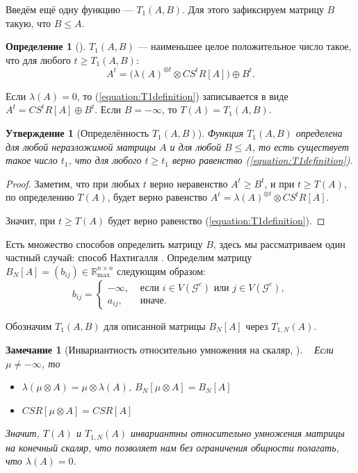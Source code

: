 \documentclass[12pt]{article}
\newtheorem{proposition}[theorem]{Утверждение}
\newtheorem{remark}[theorem]{Замечание}
\theoremstyle{definition}
\newtheorem{definition}[theorem]{Определение}
\begin{document}
Введём ещё одну функцию --- $T_1(A, B)$. Для этого зафиксируем матрицу $B$ такую, что $B \le A$.

\begin{definition} [{\cite[страница 165]{15WeakCSRExpantion}}]
\label{T1definition}
$T_1(A, B)$ --- наименьшее целое положительное число такое, что для любого $t \ge T_1(A, B)$:
\begin{equation}
\label{equation:T1definition}
    A^t = \big(\lambda(A)^{\otimes t} \otimes CS^tR[A] \big) \oplus B^t.
\end{equation}
\end{definition}

Если $\lambda(A) = 0$, то (\ref{equation:T1definition}) записывается в виде $A^t = CS^tR[A] \oplus B^t$. Если $B = -\infty$, то $T(A) = T_1(A, B)$.

\begin{proposition} [Определённость $T_1(A, B)$]
Функция $T_1(A, B)$ определена для любой неразложимой матрицы $A$ и для любой $B \le A$, то есть существует такое число $t_1$, что для любого $t \ge t_1$ верно равенство (\ref{equation:T1definition}).
\end{proposition}
\begin{proof}
Заметим, что при любых $t$ верно неравенство $A^t \ge B^t$, и при $t \ge T(A)$, по определению $T(A)$, будет верно равенство $A^t = \lambda(A)^{\otimes t} \otimes CS^tR[A]$.

Значит, при $t \ge T(A)$ будет верно равенство (\ref{equation:T1definition}).
\end{proof}

Есть множество способов определить матрицу $B$, здесь мы рассматриваем один частный случай: способ Нахтигалля \cite[страница 170]{15WeakCSRExpantion}. Определим матрицу $B_N[A] = (b_{ij}) \in \mathbb{R}_{\max}^{n \times n}$ следующим образом:
\begin{equation*}
    b_{ij} = 
    \begin{cases}
        -\infty,& \text{ если $i \in V(\mathcal{G}^c)$ или $j\in V(\mathcal{G}^c)$}, \\
        a_{ij},& \text{ иначе.}
    \end{cases}
\end{equation*}

Обозначим $T_1(A, B)$ для описанной матрицы $B_N[A]$ через $T_{1, N}(A)$.

\begin{remark} [{Инвариантность относительно умножения на скаляр, \cite[страница 287]{bounds}}] { \ }
\label{invarianceOfT}
Если $\mu \ne -\infty$, то

\begin{itemize}
	\item $\lambda(\mu \otimes A) = \mu \otimes \lambda(A)$, $B_N[\mu \otimes A] = B_N[A]$
	\item $CSR[\mu \otimes A] = CSR[A]$
\end{itemize}

Значит, $T(A)$ и $T_{1, N}(A)$ инвариантны относительно умножения матрицы на конечный скаляр, что позволяет нам без ограничения общности полагать, что $\lambda(A) = 0$.
\end{remark}
\end{document}
